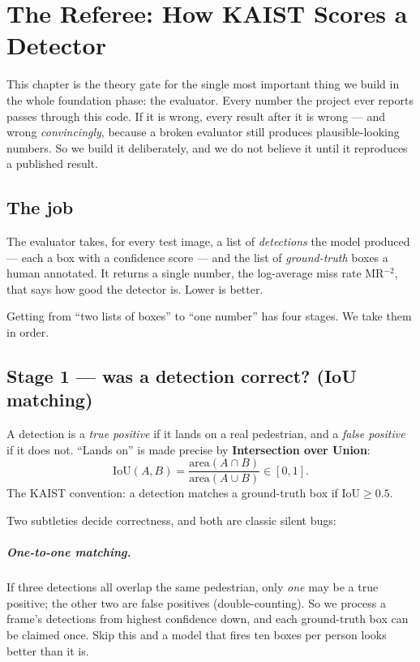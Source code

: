 \documentclass[../main.tex]{subfiles}
\begin{document}
\chapter{The Referee: How KAIST Scores a Detector}

This chapter is the theory gate for the single most important thing we build in the whole
foundation phase: the evaluator. Every number the project ever reports passes through this code.
If it is wrong, every result after it is wrong --- and wrong \emph{convincingly}, because a broken
evaluator still produces plausible-looking numbers. So we build it deliberately, and we do not
believe it until it reproduces a published result.

\section{The job}

The evaluator takes, for every test image, a list of \emph{detections} the model produced --- each
a box with a confidence score --- and the list of \emph{ground-truth} boxes a human annotated. It
returns a single number, the log-average miss rate MR$^{-2}$, that says how good the detector is.
Lower is better.

Getting from ``two lists of boxes'' to ``one number'' has four stages. We take them in order.

\section{Stage 1 --- was a detection correct? (IoU matching)}

A detection is a \emph{true positive} if it lands on a real pedestrian, and a \emph{false
positive} if it does not. ``Lands on'' is made precise by \textbf{Intersection over Union}:
\[
  \mathrm{IoU}(A, B) = \frac{\text{area}(A \cap B)}{\text{area}(A \cup B)} \in [0, 1].
\]
The KAIST convention: a detection matches a ground-truth box if $\mathrm{IoU} \geq 0.5$.

Two subtleties decide correctness, and both are classic silent bugs:

\paragraph{One-to-one matching.} If three detections all overlap the same pedestrian, only
\emph{one} may be a true positive; the other two are false positives (double-counting). So we
process a frame's detections from highest confidence down, and each ground-truth box can be
claimed once. Skip this and a model that fires ten boxes per person looks better than it is.
\end{document}
